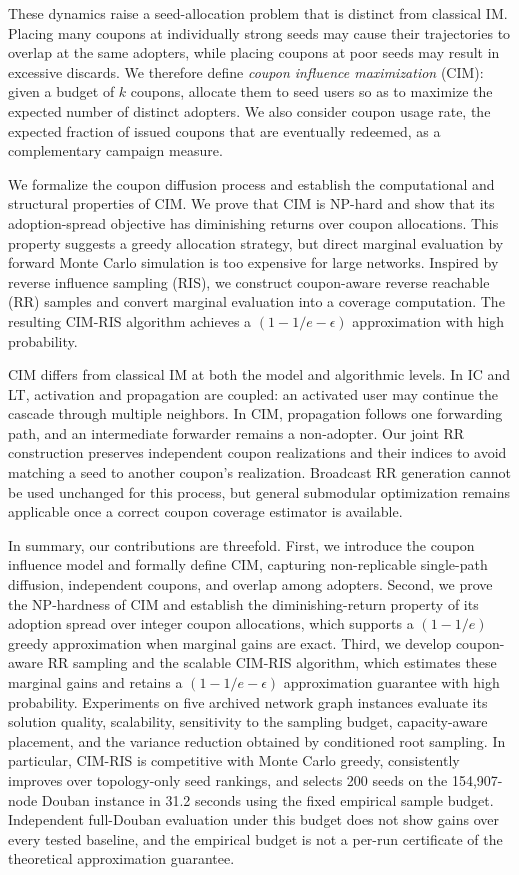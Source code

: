 \documentclass[sigconf,balance=false]{acmart}
\newcommand{\CIMRIS}{\textsc{CIM-RIS}}
\begin{document}
These dynamics raise a seed-allocation problem that is distinct from
classical IM.
Placing many coupons at individually strong seeds may cause their
trajectories to overlap at the same adopters, while placing coupons at
poor seeds may result in excessive discards.
We therefore define \emph{coupon influence maximization} (CIM): given a
budget of $k$ coupons, allocate them to seed users so as to maximize the
expected number of distinct adopters.
We also consider coupon usage rate, the expected fraction of issued
coupons that are eventually redeemed, as a complementary campaign
measure.

We formalize the coupon diffusion process and establish the computational
and structural properties of CIM.
We prove that CIM is NP-hard and show that its adoption-spread objective
has diminishing returns over coupon allocations.
This property suggests a greedy allocation strategy, but direct marginal
evaluation by forward Monte Carlo simulation is too expensive for large
networks.
Inspired by reverse influence sampling (RIS), we construct coupon-aware
reverse reachable (RR) samples and convert marginal evaluation into a
coverage computation.
The resulting \CIMRIS{} algorithm achieves a
$(1-1/e-\epsilon)$ approximation with high probability.

CIM differs from classical IM at both the model and algorithmic levels.
In IC and LT, activation and propagation are coupled: an activated user
may continue the cascade through multiple neighbors.
In CIM, propagation follows one forwarding path, and an intermediate
forwarder remains a non-adopter.
Our joint RR construction preserves independent coupon realizations and
their indices to avoid matching a seed to another coupon's realization.
Broadcast RR generation cannot be used unchanged for this process, but
general submodular optimization remains applicable once a correct coupon
coverage estimator is available.

In summary, our contributions are threefold.
First, we introduce the coupon influence model and formally define CIM,
capturing non-replicable single-path diffusion, independent coupons, and
overlap among adopters.
Second, we prove the NP-hardness of CIM and establish the diminishing-return
property of its adoption spread over integer coupon allocations, which
supports a $(1-1/e)$ greedy approximation when marginal gains are exact.
Third, we develop coupon-aware RR sampling and the scalable \CIMRIS{}
algorithm, which estimates these marginal gains and retains a
$(1-1/e-\epsilon)$ approximation guarantee with high probability.
Experiments on five archived network graph instances evaluate its
solution quality, scalability, sensitivity to the sampling budget,
capacity-aware placement, and the variance reduction obtained by conditioned
root sampling. In particular, \CIMRIS{} is competitive with Monte Carlo
greedy, consistently improves over topology-only seed rankings, and selects
200 seeds on the 154,907-node Douban instance in 31.2 seconds using the
fixed empirical sample budget.
Independent full-Douban evaluation under this budget does not show gains
over every tested baseline, and the empirical budget is not a per-run
certificate of the theoretical approximation guarantee.
\end{document}
